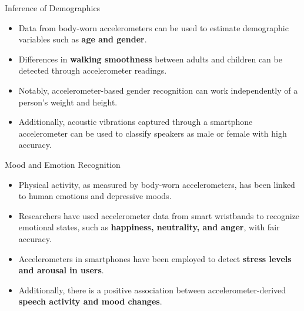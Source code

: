 \documentclass[ucs,9pt]{beamer}
\begin{document}
\begin{frame}{Inference of Demographics}
 \begin{itemize}
	\item Data from body-worn accelerometers can be used to estimate demographic variables such as \textbf{age and gender}.  
	\item Differences in \textbf{walking smoothness} between adults and children
	can be detected through accelerometer readings. 
	\item  Notably, accelerometer-based gender recognition can work independently of a person’s weight and height. 
	\item Additionally, acoustic vibrations captured
	through a smartphone accelerometer can be used to classify
	speakers as male or female with high accuracy.
 \end{itemize}
\end{frame}


\begin{frame}{Mood and Emotion Recognition}
	\begin{itemize}
		\item Physical activity, as measured by body-worn accelerometers, has been linked to human emotions and depressive moods. 
		\item Researchers have used accelerometer data from smart
		wristbands to recognize emotional states, such as \textbf{happiness,
		neutrality, and anger}, with fair accuracy.
		\item  Accelerometers in smartphones have been employed to detect \textbf{stress levels and arousal in users}. 
		\item Additionally, there is a positive association between accelerometer-derived \textbf{speech activity and mood changes}.
	\end{itemize}
\end{frame}
\end{document}
